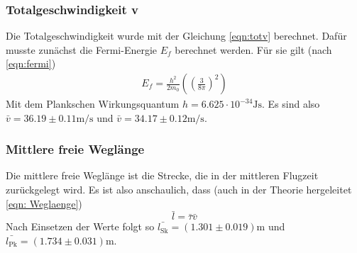 \subsubsection{Totalgeschwindigkeit v}

Die Totalgeschwindigkeit wurde mit der Gleichung \eqref{eqn:totv} berechnet.
Dafür musste zunächst die Fermi-Energie $E_f$ berechnet werden. Für sie gilt (nach \eqref{eqn:fermi})
\begin{align*}
E_f = \frac{h^2}{2 m_0} \left( \left( \frac{3}{8 \pi} \right)^2 \right)
\end{align*}
Mit dem Plankschen Wirkungsquantum $h = 6.625 \cdot 10^{-34}\si{\joule\s}$.
Es sind also $\bar{v} = 36.19 \pm 0.11 \si{\m\per\s}$ und $\bar{v} = 34.17 \pm 0.12 \si{\m\per\s}$.

\subsubsection{Mittlere freie Weglänge}

Die mittlere freie Weglänge ist die Strecke, die in der mittleren Flugzeit
zurückgelegt wird. Es ist also anschaulich, dass (auch in der Theorie hergeleitet \eqref{eqn: Weglaenge}) 
\begin{equation*}
\bar{l} = \bar{ \tau } \bar{v}
\end{equation*}
Nach Einsetzen der Werte folgt so $\bar{l_\text{Sk}} = \left( 1.301 \pm 0.019 \right) \si{\m}$
und $\bar{l_\text{Pk}} = \left( 1.734 \pm 0.031 \right) \si{\m}$.

